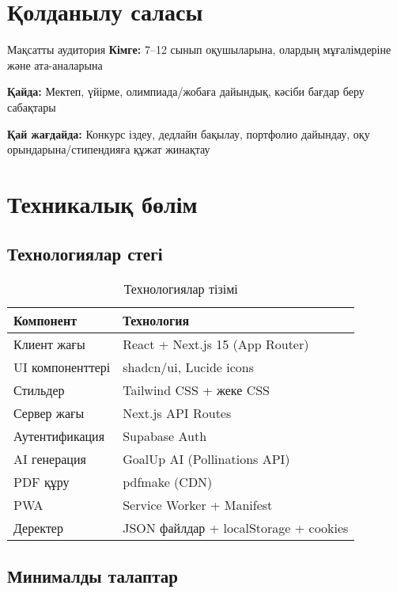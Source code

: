 \documentclass[12pt,a4paper]{article}
\begin{document}
\section{Қолданылу саласы}

\begin{infobox}{Мақсатты аудитория}
\textbf{Кімге:} 7–12 сынып оқушыларына, олардың мұғалімдеріне және ата-аналарына

\textbf{Қайда:} Мектеп, үйірме, олимпиада/жобаға дайындық, кәсіби бағдар беру сабақтары

\textbf{Қай жағдайда:} Конкурс іздеу, дедлайн бақылау, портфолио дайындау, оқу орындарына/стипендияға құжат жинақтау
\end{infobox}

\section{Техникалық бөлім}

\subsection{Технологиялар стегі}

\begin{table}[h!]
\centering
\begin{tabular}{|l|l|}
\hline
\textbf{Компонент} & \textbf{Технология} \\
\hline
Клиент жағы & React + Next.js 15 (App Router) \\
\hline
UI компоненттері & shadcn/ui, Lucide icons \\
\hline
Стильдер & Tailwind CSS + жеке CSS \\
\hline
Сервер жағы & Next.js API Routes \\
\hline
Аутентификация & Supabase Auth \\
\hline
AI генерация & GoalUp AI (Pollinations API) \\
\hline
PDF құру & pdfmake (CDN) \\
\hline
PWA & Service Worker + Manifest \\
\hline
Деректер & JSON файлдар + localStorage + cookies \\
\hline
\end{tabular}
\caption{Технологиялар тізімі}
\end{table}

\subsection{Минималды талаптар}
\end{document}
